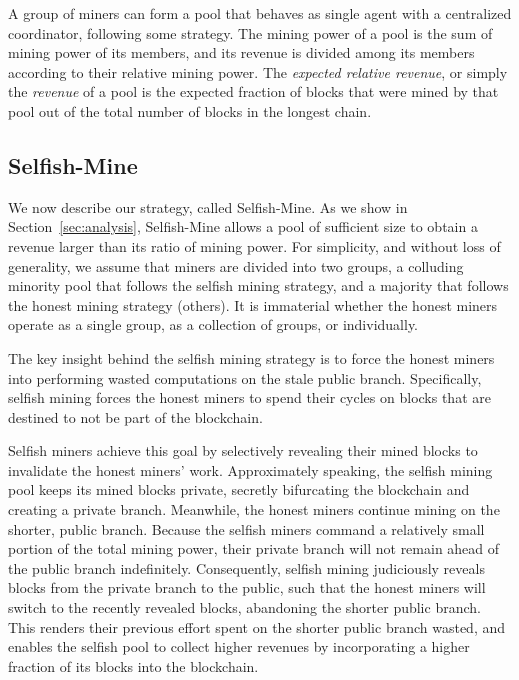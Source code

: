 \documentclass[letterpaper]{llncs}
\begin{document}
\newcommand{\poolSet}{\ensuremath{ P }}
\newcommand{\pool}{\ensuremath{ p }}
\newcommand{\poolNum}{\ensuremath{ l }}

A group of miners can form a pool that behaves as single agent with a centralized coordinator, following some strategy. The mining power of a pool is the sum of mining power of its members, and its revenue is divided among its members according to their relative mining power. 
The \emph{expected relative revenue}, or simply the \emph{revenue} of a pool is the expected fraction of blocks that were mined by that pool out of the total number of blocks in the longest chain. 

        \subsection{Selfish-Mine}

We now describe our strategy, called Selfish-Mine. As we show in Section~\ref{sec:analysis}, Selfish-Mine allows a pool of sufficient size to obtain a revenue larger than its ratio of mining power. 
    For simplicity, and without loss of generality, we assume that miners are divided into two groups, a colluding minority pool that follows the selfish mining strategy,
and a majority that follows the honest mining strategy (others). It is immaterial whether the honest miners operate as a single group, as a collection of groups, or individually.

The key insight behind the selfish mining strategy is to force the honest miners into performing wasted computations on the stale public branch. Specifically, selfish mining forces the honest miners to spend their cycles on blocks that are destined to not be part of the blockchain. 

Selfish miners achieve this goal by selectively revealing their mined blocks to invalidate the honest miners' work. 
Approximately speaking, the selfish mining pool keeps its mined blocks private, secretly bifurcating the blockchain and creating a private branch. 
Meanwhile, the honest miners continue mining on the shorter, public branch. 
Because the selfish miners command a relatively small portion of the total mining power, their private branch will not remain ahead of the public branch indefinitely. 
Consequently, selfish mining judiciously reveals blocks from the private branch to the public, such that the honest miners will switch to the recently revealed blocks,
abandoning the shorter public branch. 
This renders their previous effort spent on the shorter public branch wasted, and enables the selfish pool to collect higher revenues by incorporating a higher fraction
of its blocks into the blockchain. 
\end{document}
